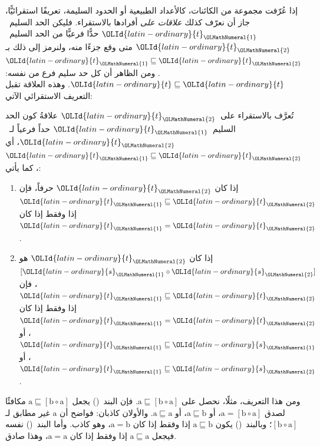 \documentclass[../../../include/open-logic-section]{subfiles}
\begin{document}


إذا عُرّفت مجموعة من الكائنات، كالأعداد الطبيعية أو الحدود السليمة،
تعريفًا استقرائيًّا، جاز أن نعرّف كذلك \emph{علاقات على} أفرادها
بالاستقراء. فليكن الحد السليم~$\OLId{latin-ordinary}{t}_\OLMathNumeral{1}$ حدًّا فرعيًّا من الحد السليم~$\OLId{latin-ordinary}{t}_\OLMathNumeral{2}$
متى وقع جزءًا منه، ولنرمز إلى ذلك بـ$\OLId{latin-ordinary}{t}_\OLMathNumeral{1} \sqsubseteq \OLId{latin-ordinary}{t}_\OLMathNumeral{2}$. ومن الظاهر
أن كل حد سليم فرع من نفسه: $\OLId{latin-ordinary}{t} \sqsubseteq \OLId{latin-ordinary}{t}$. وهذه العلاقة تقبل
التعريف الاستقرائي الآتي:

\begin{defn}
  تُعرَّف بالاستقراء على~$\OLId{latin-ordinary}{t}_\OLMathNumeral{2}$ علاقةُ كون الحد السليم~$\OLId{latin-ordinary}{t}_\OLMathNumeral{1}$ حداً فرعياً
  لـ~$\OLId{latin-ordinary}{t}_\OLMathNumeral{2}$، أي $\OLId{latin-ordinary}{t}_\OLMathNumeral{1} \sqsubseteq \OLId{latin-ordinary}{t}_\OLMathNumeral{2}$، كما يأتي:
  \begin{enumerate}
  \item إذا كان $\OLId{latin-ordinary}{t}_\OLMathNumeral{2}$ حرفاً، فإن $\OLId{latin-ordinary}{t}_\OLMathNumeral{1} \sqsubseteq \OLId{latin-ordinary}{t}_\OLMathNumeral{2}$ إذا وفقط إذا كان
    $\OLId{latin-ordinary}{t}_\OLMathNumeral{1} = \OLId{latin-ordinary}{t}_\OLMathNumeral{2}$.
  \item إذا كان $\OLId{latin-ordinary}{t}_\OLMathNumeral{2}$ هو $[\OLId{latin-ordinary}{s}_\OLMathNumeral{1} \circ \OLId{latin-ordinary}{s}_\OLMathNumeral{2}]$، فإن
    $\OLId{latin-ordinary}{t}_\OLMathNumeral{1} \sqsubseteq \OLId{latin-ordinary}{t}_\OLMathNumeral{2}$ إذا وفقط إذا كان $\OLId{latin-ordinary}{t}_\OLMathNumeral{1} = \OLId{latin-ordinary}{t}_\OLMathNumeral{2}$، أو
    $\OLId{latin-ordinary}{t}_\OLMathNumeral{1} \sqsubseteq \OLId{latin-ordinary}{s}_\OLMathNumeral{1}$، أو $\OLId{latin-ordinary}{t}_\OLMathNumeral{1} \sqsubseteq \OLId{latin-ordinary}{s}_\OLMathNumeral{2}$.
  \end{enumerate}
\end{defn}

ومن هذا التعريف، مثلًا، نحصل على $
\mathrm{a} \sqsubseteq [\mathrm{b} \circ \mathrm{a}]$. فإن البند~()
يجعل $
\mathrm{a} \sqsubseteq [\mathrm{b} \circ \mathrm{a}]$ مكافئًا لصدق
$\mathrm{a} = [\mathrm{b} \circ \mathrm{a}]$، أو
$\mathrm{a} \sqsubseteq \mathrm{b}$، أو
$\mathrm{a} \sqsubseteq \mathrm{a}$. والأولان كاذبان: فواضح أن
$\mathrm{a}$ غير مطابق لـ$[\mathrm{b} \circ \mathrm{a}]$؛ وبالبند~()
يكون $\mathrm{a} \sqsubseteq \mathrm{b}$ إذا وفقط إذا كان
$\mathrm{a} = \mathrm{b}$، وهو كاذب. وأما البند~() نفسه فيجعل
$\mathrm{a} \sqsubseteq \mathrm{a}$ إذا وفقط إذا كان
$\mathrm{a} = \mathrm{a}$، وهذا صادق.
\end{document}
